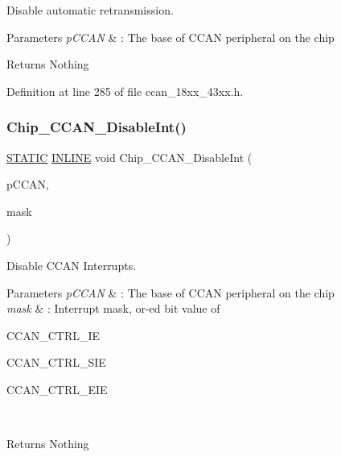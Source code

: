 Disable automatic retransmission. 


\begin{DoxyParams}{Parameters}
{\em p\+C\+C\+AN} & \+: The base of C\+C\+AN peripheral on the chip \\
\hline
\end{DoxyParams}
\begin{DoxyReturn}{Returns}
Nothing 
\end{DoxyReturn}


Definition at line 285 of file ccan\+\_\+18xx\+\_\+43xx.\+h.

\mbox{\label{group___c_c_a_n__18_x_x__43_x_x_gaf4667bd6b992eabb841d91e9b6a753be}} 
\subsubsection{\texorpdfstring{Chip\+\_\+\+C\+C\+A\+N\+\_\+\+Disable\+Int()}{Chip\_CCAN\_DisableInt()}}
{\footnotesize\ttfamily \hyperlink{group___l_p_c___types___public___macros_ga10b2d890d871e1489bb02b7e70d9bdfb}{S\+T\+A\+T\+IC} \hyperlink{spifi__18xx__43xx_8h_a2eb6f9e0395b47b8d5e3eeae4fe0c116}{I\+N\+L\+I\+NE} void Chip\+\_\+\+C\+C\+A\+N\+\_\+\+Disable\+Int (\begin{DoxyParamCaption}\item[{\hyperlink{struct_l_p_c___c_c_a_n___t}{L\+P\+C\+\_\+\+C\+C\+A\+N\+\_\+T} $\ast$}]{p\+C\+C\+AN,  }\item[{uint32\+\_\+t}]{mask }\end{DoxyParamCaption})}



Disable C\+C\+AN Interrupts. 


\begin{DoxyParams}{Parameters}
{\em p\+C\+C\+AN} & \+: The base of C\+C\+AN peripheral on the chip \\
\hline
{\em mask} & \+: Interrupt mask, or-\/ed bit value of
\begin{DoxyItemize}
\item C\+C\+A\+N\+\_\+\+C\+T\+R\+L\+\_\+\+IE ~\newline

\item C\+C\+A\+N\+\_\+\+C\+T\+R\+L\+\_\+\+S\+IE ~\newline

\item C\+C\+A\+N\+\_\+\+C\+T\+R\+L\+\_\+\+E\+IE ~\newline
 
\end{DoxyItemize}\\
\hline
\end{DoxyParams}
\begin{DoxyReturn}{Returns}
Nothing 
\end{DoxyReturn}


